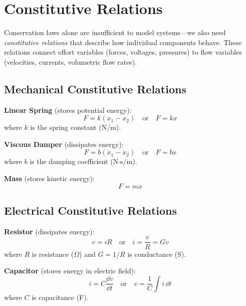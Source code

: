 \section{Constitutive Relations}
\label{sec:constitutive}

Conservation laws alone are insufficient to model systems---we also need \emph{constitutive relations} that describe how individual components behave. These relations connect effort variables (forces, voltages, pressures) to flow variables (velocities, currents, volumetric flow rates).

\subsection{Mechanical Constitutive Relations}

\textbf{Linear Spring} (stores potential energy):
\begin{equation}
F = k(x_1 - x_2) \quad \text{or} \quad F = kx
\label{eq:spring_const}
\end{equation}
where $k$ is the spring constant (N/m).

\textbf{Viscous Damper} (dissipates energy):
\begin{equation}
F = b(\dot{x}_1 - \dot{x}_2) \quad \text{or} \quad F = b\dot{x}
\label{eq:damper_const}
\end{equation}
where $b$ is the damping coefficient (N$\cdot$s/m).

\textbf{Mass} (stores kinetic energy):
\begin{equation}
F = m\ddot{x}
\label{eq:mass_const}
\end{equation}

\subsection{Electrical Constitutive Relations}

\textbf{Resistor} (dissipates energy):
\begin{equation}
v = iR \quad \text{or} \quad i = \frac{v}{R} = Gv
\label{eq:resistor_const}
\end{equation}
where $R$ is resistance ($\Omega$) and $G = 1/R$ is conductance (S).

\textbf{Capacitor} (stores energy in electric field):
\begin{equation}
i = C\frac{\dd v}{\dd t} \quad \text{or} \quad v = \frac{1}{C}\int i \, \dd t
\label{eq:capacitor_const}
\end{equation}
where $C$ is capacitance (F).

